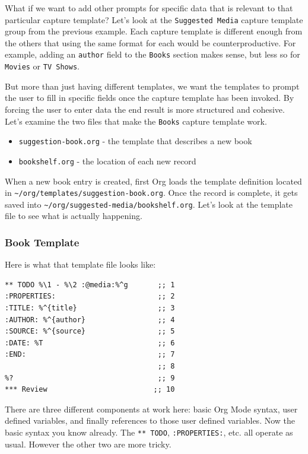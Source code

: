 \documentclass[11pt]{article}
\begin{document}
What if we want to add other prompts for specific data that is relevant to that particular capture template? Let's look at the \texttt{Suggested Media} capture template group from the previous example. Each capture template is different enough from the others that using the same format for each would be counterproductive. For example, adding an \texttt{author} field to the \texttt{Books} section makes sense, but less so for \texttt{Movies} or \texttt{TV Shows}.

But more than just having different templates, we want the templates to prompt the user to fill in specific fields once the capture template has been invoked. By forcing the user to enter data the end result is more structured and cohesive. Let's examine the two files that make the \texttt{Books} capture template work.

\begin{itemize}
\item \texttt{suggestion-book.org} - the template that describes a new book
\item \texttt{bookshelf.org} - the location of each new record
\end{itemize}

When a new book entry is created, first Org loads the template definition located in \texttt{\textasciitilde{}/org/templates/suggestion-book.org}. Once the record is complete, it gets saved into \texttt{\textasciitilde{}/org/suggested-media/bookshelf.org}. Let's look at the template file to see what is actually happening.
\subsubsection*{Book Template}
\label{sec:orga66dade}
Here is what that template file looks like:

\begin{verbatim}
** TODO %\1 - %\2 :@media:%^g       ;; 1
:PROPERTIES:                        ;; 2
:TITLE: %^{title}                   ;; 3
:AUTHOR: %^{author}                 ;; 4
:SOURCE: %^{source}                 ;; 5
:DATE: %T                           ;; 6
:END:                               ;; 7
                                    ;; 8
%?                                  ;; 9
*** Review                         ;; 10
\end{verbatim}

There are three different components at work here: basic Org Mode syntax, user defined variables, and finally references to those user defined variables. Now the basic syntax you know already. The \texttt{** TODO}, \texttt{:PROPERTIES:}, etc. all operate as usual. However the other two are more tricky.
\end{document}
